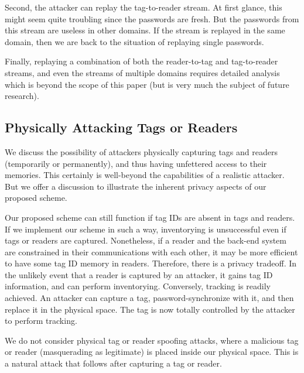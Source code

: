 Second, the attacker can replay the tag-to-reader stream.  At first glance, this might seem quite troubling since the passwords are fresh.  But the passwords from this stream are useless in other domains.  If the stream is replayed in the same domain, then we are back to the situation of replaying single passwords.

Finally, replaying a combination of both the reader-to-tag and tag-to-reader streams, and even the streams of multiple domains requires detailed analysis which is beyond the scope of this paper (but is very much the subject of future research).

\subsection{Physically Attacking Tags or Readers}
\label{sec:Physically_Attacking_Tags_and_Readers}
We discuss the possibility of attackers physically capturing tags and readers (temporarily or permanently), and thus having unfettered access to their memories.  This certainly is well-beyond the capabilities of a realistic attacker.  But we offer a discussion to illustrate the inherent privacy aspects of our proposed scheme.

Our proposed scheme can still function if tag IDs are absent in tags and readers.  If we implement our scheme in such a way, inventorying is unsuccessful even if tags or readers are captured.  Nonetheless, if a reader and the back-end system are constrained in their communications with each other, it may be more efficient to have some tag ID memory in readers.  Therefore, there is a privacy tradeoff.  In the unlikely event that a reader is captured by an attacker, it gains tag ID information, and can perform inventorying.  Conversely, tracking is readily achieved.  An attacker can capture a tag, password-synchronize with it, and then replace it in the physical space.  The tag is now totally controlled by the attacker to perform tracking.

We do not consider physical tag or reader spoofing attacks, where a malicious tag or reader (masquerading as legitimate) is placed inside our physical space.  This is a natural attack that follows after capturing a tag or reader.


